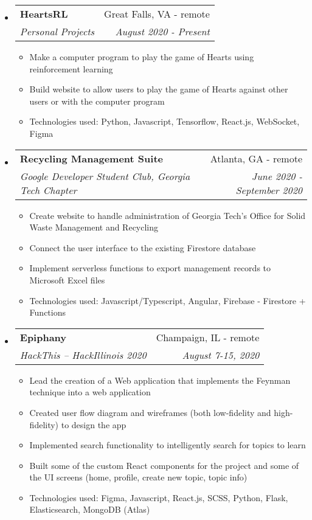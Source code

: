 \documentclass[letterpaper,11pt]{article}
\makeatletter
\newcommand{\resitem}[1]{\item #1 \vspace{-2pt}}
\newcommand{\ressubheading}[4]{
\begin{tabular*}{7.0in}{l@{\extracolsep{\fill}}r}
		\textbf{#1} & #2 \\
		\textit{#3} & \textit{#4} \\
\end{tabular*}\vspace{-6pt}}
\makeatother
\begin{document}
\begin{itemize}
\item
    \ressubheading{HeartsRL}{Great Falls, VA - remote}{Personal Projects}{August 2020 - Present}
    \begin{itemize}
        \resitem{Make a computer program to play the game of Hearts using reinforcement learning}
        \resitem{Build website to allow users to play the game of Hearts against other users or with the computer program}
        \resitem{Technologies used: Python, Javascript, Tensorflow, React.js, WebSocket, Figma}
    \end{itemize}
\item
    \ressubheading{Recycling Management Suite}{Atlanta, GA - remote}{Google Developer Student Club, Georgia Tech Chapter}{June 2020 - September 2020}
    \begin{itemize}
        \resitem{Create website to handle administration of Georgia Tech's Office for Solid Waste Management and Recycling}
        \resitem{Connect the user interface to the existing Firestore database}
        \resitem{Implement serverless functions to export management records to Microsoft Excel files}
        \resitem{Technologies used: Javascript/Typescript, Angular, Firebase - Firestore + Functions}
    \end{itemize}
\item
    \ressubheading{Epiphany}{Champaign, IL - remote}{HackThis -- HackIllinois 2020}{August 7-15, 2020}
    \begin{itemize}
        \resitem{Lead the creation of a Web application that implements the Feynman technique into a web application}
        \resitem{Created user flow diagram and wireframes (both low-fidelity and high-fidelity) to design the app}
        \resitem{Implemented search functionality to intelligently search for topics to learn}
        \resitem{Built some of the custom React components for the project and some of the UI screens (home, profile, create new topic, topic info)}
        \resitem{Technologies used: Figma, Javascript, React.js, SCSS, Python, Flask, Elasticsearch, MongoDB (Atlas)}

\end{itemize}
\end{itemize}
\end{document}
